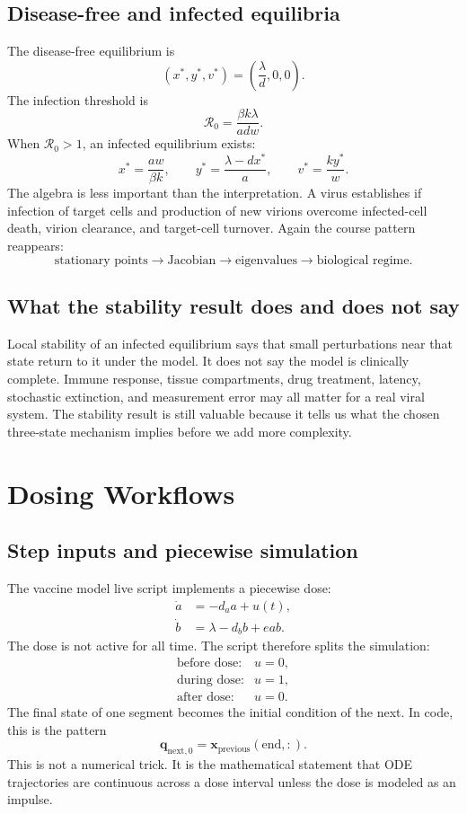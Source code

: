 \documentclass[a4paper]{article}
\newcommand{\vect}[1]{\boldsymbol{#1}}
\newcommand{\Rzero}{\mathcal R_0}
\begin{document}
\subsection{Disease-free and infected equilibria}

The disease-free equilibrium is
\[
  (x^\ast,y^\ast,v^\ast)=\left(\frac{\lambda}{d},0,0\right).
\]
The infection threshold is
\[
  \Rzero=\frac{\beta k\lambda}{adw}.
\]
When \(\Rzero>1\), an infected equilibrium exists:
\[
  x^\ast=\frac{aw}{\beta k},\qquad
  y^\ast=\frac{\lambda-dx^\ast}{a},\qquad
  v^\ast=\frac{k y^\ast}{w}.
\]
The algebra is less important than the interpretation. A virus establishes if infection of target cells and production of new virions overcome infected-cell death, virion clearance, and target-cell turnover. Again the course pattern reappears:
\[
  \text{stationary points}
  \longrightarrow
  \text{Jacobian}
  \longrightarrow
  \text{eigenvalues}
  \longrightarrow
  \text{biological regime}.
\]

\subsection{What the stability result does and does not say}

Local stability of an infected equilibrium says that small perturbations near that state return to it under the model. It does not say the model is clinically complete. Immune response, tissue compartments, drug treatment, latency, stochastic extinction, and measurement error may all matter for a real viral system. The stability result is still valuable because it tells us what the chosen three-state mechanism implies before we add more complexity.

\section{Dosing Workflows}

\subsection{Step inputs and piecewise simulation}

The vaccine model live script implements a piecewise dose:
\[
  \begin{aligned}
  \dot a &= -d_a a+u(t),\\
  \dot b &= \lambda-d_b b+eab.
  \end{aligned}
\]
The dose is not active for all time. The script therefore splits the simulation:
\[
  \begin{array}{ll}
  \text{before dose:} & u=0,\\
  \text{during dose:} & u=1,\\
  \text{after dose:} & u=0.
  \end{array}
\]
The final state of one segment becomes the initial condition of the next. In code, this is the pattern
\[
  \vect q_{\mathrm{next},0}=\vect x_{\mathrm{previous}}(\text{end},:).
\]
This is not a numerical trick. It is the mathematical statement that ODE trajectories are continuous across a dose interval unless the dose is modeled as an impulse.
\end{document}
